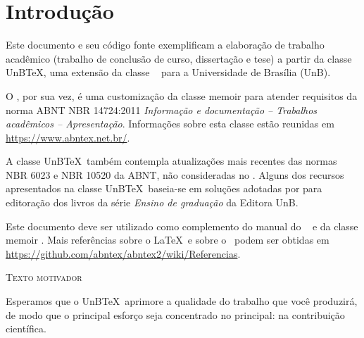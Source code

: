 \chapter{Introdução}
\label{cap:intr}

Este documento e seu código fonte exemplificam a elaboração de trabalho acadêmico (trabalho de conclusão de curso, dissertação e tese) a partir da classe UnB\TeX, uma extensão da classe \abnTeX\  \cite{Castro2019} para a Universidade de Brasília (UnB).


O \abnTeX, por sua vez, é uma customização da classe \textsf{memoir} para atender requisitos da norma ABNT NBR 14724:2011 \emph{Informação e documentação -- Trabalhos acadêmicos -- Apresentação}. Informações sobre esta classe estão reunidas em \url{https://www.abntex.net.br/}.


A classe UnB\TeX\ também contempla atualizações mais recentes das normas NBR 6023 \cite{NBR6023:2018} e NBR 10520 \cite{NBR10520:2023} da ABNT, não consideradas no \abnTeX. Alguns dos recursos apresentados na classe UnB\TeX\ baseia-se em soluções adotadas por  para editoração dos livros da série \emph{Ensino de graduação} da Editora UnB.

Este documento deve ser utilizado como complemento do manual do \abnTeX\ \cite{abntex2classe} e da classe \textsf{memoir} \cite{memoir}. Mais referências sobre o \LaTeX\ e sobre o \abnTeX\ podem ser obtidas em \url{https://github.com/abntex/abntex2/wiki/Referencias}.

\begin{mdframed}[style=plainSty] %

{\center \textsc{Texto motivador} \par}

\noindent Esperamos que o UnB\TeX\ aprimore a qualidade do trabalho que você produzirá, de modo que o principal esforço seja concentrado no principal: na contribuição científica.

\end{mdframed}